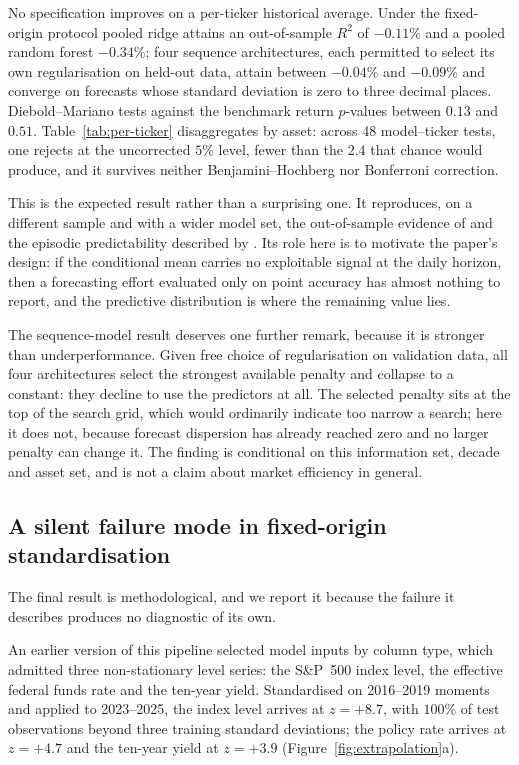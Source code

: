 No specification improves on a per-ticker historical average. Under the
fixed-origin protocol pooled ridge attains an out-of-sample $R^2$ of $-0.11\%$
and a pooled random forest $-0.34\%$; four sequence architectures, each
permitted to select its own regularisation on held-out data, attain between
$-0.04\%$ and $-0.09\%$ and converge on forecasts whose standard deviation is
zero to three decimal places. Diebold--Mariano tests against the benchmark
return $p$-values between $0.13$ and $0.51$. Table~\ref{tab:per-ticker}
disaggregates by asset: across 48 model--ticker tests, one rejects at the
uncorrected $5\%$ level, fewer than the $2.4$ that chance would produce, and it
survives neither Benjamini--Hochberg \citep{benjamini1995controlling} nor
Bonferroni correction.

This is the expected result rather than a surprising one. It reproduces, on a
different sample and with a wider model set, the out-of-sample evidence of
\citet{welch2008comprehensive} and the episodic predictability described by
\citet{timmermann2008elusive}. Its role here is to motivate the paper's design:
if the conditional mean carries no exploitable signal at the daily horizon, then
a forecasting effort evaluated only on point accuracy has almost nothing to
report, and the predictive distribution is where the remaining value lies.

The sequence-model result deserves one further remark, because it is stronger
than underperformance. Given free choice of regularisation on validation data,
all four architectures select the strongest available penalty and collapse to a
constant: they decline to use the predictors at all. The selected penalty sits
at the top of the search grid, which would ordinarily indicate too narrow a
search; here it does not, because forecast dispersion has already reached zero
and no larger penalty can change it. The finding is conditional on this
information set, decade and asset set, and is not a claim about market
efficiency in general.

\subsection{A silent failure mode in fixed-origin standardisation}
\label{sec:pitfall}

The final result is methodological, and we report it because the failure it
describes produces no diagnostic of its own.

An earlier version of this pipeline selected model inputs by column type, which
admitted three non-stationary level series: the S\&P~500 index level, the
effective federal funds rate and the ten-year yield. Standardised on 2016--2019
moments and applied to 2023--2025, the index level arrives at $z=+8.7$, with
$100\%$ of test observations beyond three training standard deviations; the
policy rate arrives at $z=+4.7$ and the ten-year yield at $z=+3.9$
(Figure~\ref{fig:extrapolation}a).

